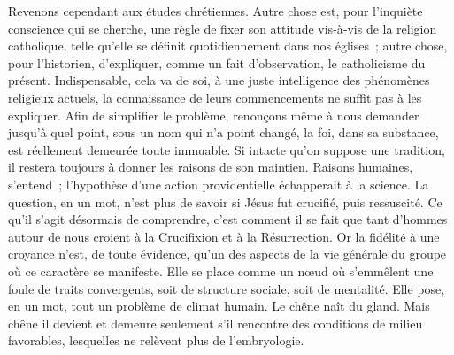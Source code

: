 \documentclass[french,twoside]{book} %
\newcommand{\astermono}{\medskip\centerline{\color{rubric}\large\selectfont{\syms ✻}}\medskip\par}%
\begin{document}
\noindent Revenons cependant aux études chrétiennes. Autre chose est, pour l’inquiète conscience qui se cherche, une règle de fixer son attitude vis‑à‑vis de la religion catholique, telle qu’elle se définit quotidiennement dans nos églises ; autre chose, pour l’historien, d’expliquer, comme un fait d’obser­vation, le catholicisme du présent. Indispensable, cela va de soi, à une juste intelligence des phénomènes religieux actuels, la connaissance de leurs commencements ne suffit pas à les expliquer. Afin de simplifier le problème, renonçons même à nous demander jusqu’à quel point, sous un nom qui n’a point changé, la foi, dans sa substance, est réellement demeurée toute immuable. Si intacte qu’on suppose une tradition, il restera toujours à donner les raisons de son maintien. Raisons humaines, s’entend ; l’hypothèse d’une action providentielle échapperait à la science. La question, en un mot, n’est plus de savoir si Jésus fut crucifié, puis ressuscité. Ce qu’il s’agit désormais de comprendre, c’est comment il se fait que tant d’hommes autour de nous croient à la Crucifixion et à la Résurrection. Or la fidélité à une croyance n’est, de toute évidence, qu’un des aspects de la vie générale du groupe où ce caractère se manifeste. Elle se place comme un nœud où s’emmêlent une foule de traits convergents, soit de structure sociale, soit de mentalité. Elle pose, en un mot, tout un pro­blème de climat humain. Le chêne naît du gland. Mais chêne il devient et demeure seulement s’il rencontre des conditions de milieu favorables, lesquelles ne relèvent plus de l’embryologie.\par

\astermono
\end{document}
